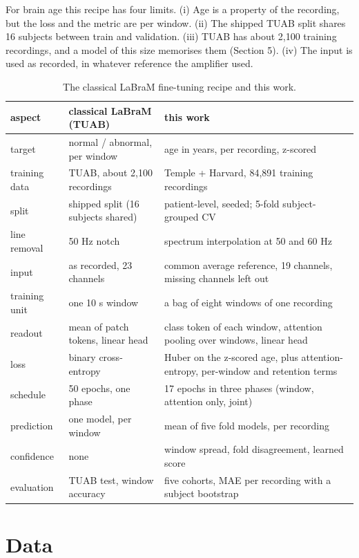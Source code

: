 \documentclass[11pt,a4paper]{article}
\begin{document}
For brain age this recipe has four limits. (i) Age is a property of the recording, but the loss and the metric are per window. (ii) The shipped TUAB split shares 16 subjects between train and validation. (iii) TUAB has about 2,100 training recordings, and a model of this size memorises them (Section 5). (iv) The input is used as recorded, in whatever reference the amplifier used.

\begin{table}[t]
\centering
\small
\caption{The classical LaBraM fine-tuning recipe and this work.}
\begin{tabular}{lll}
\toprule
\textbf{aspect} & \textbf{classical LaBraM (TUAB)} & \textbf{this work} \\
\midrule
target & normal / abnormal, per window & age in years, per recording, z-scored \\
training data & TUAB, about 2,100 recordings & Temple + Harvard, 84,891 training recordings \\
split & shipped split (16 subjects shared) & patient-level, seeded; 5-fold subject-grouped CV \\
line removal & 50 Hz notch & spectrum interpolation at 50 and 60 Hz \\
input & as recorded, 23 channels & common average reference, 19 channels, missing channels left out \\
training unit & one 10 s window & a bag of eight windows of one recording \\
readout & mean of patch tokens, linear head & class token of each window, attention pooling over windows, linear head \\
loss & binary cross-entropy & Huber on the z-scored age, plus attention-entropy, per-window and retention terms \\
schedule & 50 epochs, one phase & 17 epochs in three phases (window, attention only, joint) \\
prediction & one model, per window & mean of five fold models, per recording \\
confidence & none & window spread, fold disagreement, learned score \\
evaluation & TUAB test, window accuracy & five cohorts, MAE per recording with a subject bootstrap \\
\bottomrule
\end{tabular}
\end{table}


\section{Data}
\end{document}

